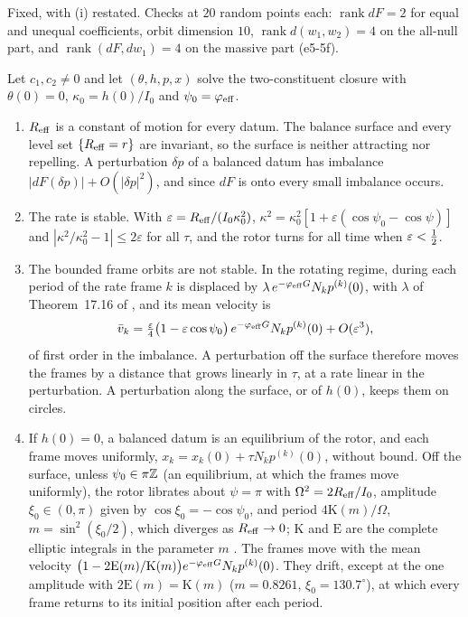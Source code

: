 Fixed, with (i) restated. Checks at $20$ random points each: $\operatorname{rank}dF=2$ for equal and unequal coefficients, orbit dimension $10$,
$\operatorname{rank}d(w_1,w_2)=4$ on the all-null part, and $\operatorname{rank}(dF,dw_1)=4$ on the massive part (e5-5f).

\begin{theorem}
\label{e5:thm:stab}
Let $c_1,c_2\neq0$ and let $(\theta,h,p,x)$ solve the two-constituent closure with $\theta(0)=0$, $\kappa_0=h(0)/I_0$ and $\psi_0=\varphi_{\rm eff}$.
\begin{enumerate}[label=(\roman*),leftmargin=2.2em]
\item $R_{\rm eff}$ is a constant of motion for every datum. The balance surface and every level set $\{R_{\rm eff}=r\}$ are invariant, so the
surface is neither attracting nor repelling. A perturbation $\delta p$ of a balanced datum has imbalance $|dF(\delta p)|+O(|\delta p|^2)$, and since $dF$ is onto
every small imbalance occurs.
\item The rate is stable. With $\varepsilon=R_{\rm eff}/(I_0\kappa_0^2)$, $\kappa^2=\kappa_0^2[1+\varepsilon(\cos\psi_0-\cos\psi)]$ and
$|\kappa^2/\kappa_0^2-1|\le2\varepsilon$ for all $\tau$, and the rotor turns for all time when $\varepsilon<\tfrac12$.
\item The bounded frame orbits are not stable. In the rotating regime, during each period of the rate frame $k$ is displaced by
$\lambda\,e^{-\varphi_{\rm eff}G}N_kp^{(k)}(0)$, with $\lambda$ of Theorem~17.16 of \cite{ES17}, and its mean velocity is
\[
\bar v_k=\tfrac\varepsilon4\bigl(1-\varepsilon\cos\psi_0\bigr)\,e^{-\varphi_{\rm eff}G}N_kp^{(k)}(0)+O(\varepsilon^3),
\]
of first order in the imbalance. A perturbation off the surface therefore moves the frames by a distance that grows linearly in $\tau$, at a rate linear
in the perturbation. A perturbation along the surface, or of $h(0)$, keeps them on circles.
\item If $h(0)=0$, a balanced datum is an equilibrium of the rotor, and each frame moves uniformly, $x_k=x_k(0)+\tau N_kp^{(k)}(0)$, without bound.
Off the surface, unless $\psi_0\in\pi\mathbb{Z}$ (an equilibrium, at which the frames move uniformly), the rotor librates about $\psi=\pi$ with
$\Omega^2=2R_{\rm eff}/I_0$, amplitude $\xi_0\in(0,\pi)$ given by $\cos\xi_0=-\cos\psi_0$, and period $4\mathrm K(m)/\Omega$, $m=\sin^2(\xi_0/2)$,
which diverges as $R_{\rm eff}\to0$; $\mathrm K$ and $\mathrm E$ are the complete elliptic integrals in the parameter $m$ \cite{DLMF}. The
frames move with the mean velocity $\bigl(1-2\mathrm E(m)/\mathrm K(m)\bigr)e^{-\varphi_{\rm eff}G}N_kp^{(k)}(0)$. They drift, except at the one
amplitude with $2\mathrm E(m)=\mathrm K(m)$ ($m=0.8261$, $\xi_0=130.7^\circ$), at which every frame returns to its initial position after each
period.
\end{enumerate}
\end{theorem}

